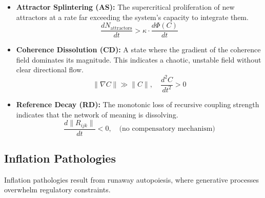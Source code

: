 \begin{itemize}
    \item \textbf{Attractor Splintering (AS):} The supercritical proliferation of new attractors at a rate far exceeding the system's capacity to integrate them.
    \begin{equation}
    \frac{dN_{\text{attractors}}}{dt} > \kappa \cdot \frac{d\Phi(C)}{dt}
    \end{equation}

    \item \textbf{Coherence Dissolution (CD):} A state where the gradient of the coherence field dominates its magnitude. This indicates a chaotic, unstable field without clear directional flow.
    \begin{equation}
    \|\nabla C\| \gg \|C\|, \quad \frac{d^2C}{dt^2} > 0
    \end{equation}

    \item \textbf{Reference Decay (RD):} The monotonic loss of recursive coupling strength indicates that the network of meaning is dissolving.
    \begin{equation}
    \frac{d\|R_{ijk}\|}{dt} < 0, \quad \text{(no compensatory mechanism)}
    \end{equation}
\end{itemize}

\subsection{Inflation Pathologies}

Inflation pathologies result from runaway autopoiesis, where generative processes overwhelm regulatory constraints.

